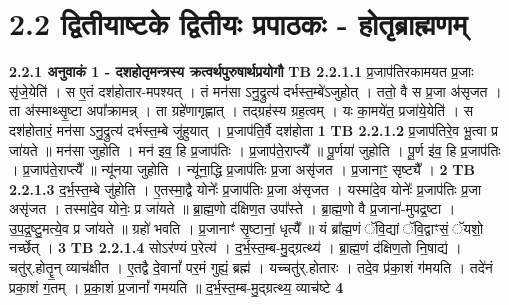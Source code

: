 \documentclass[17pt]{extarticle}
\begin{document}
     \section*{ 2.2     द्वितीयाष्टके द्वितीयः प्रपाठकः - होतृब्राह्मणम् }
                \textbf{ 2.2.1     अनुवाकं   1 - दशहोतृमन्त्रस्य क्रत्वर्थपुरुषार्थप्रयोगौ} \newline
                                \textbf{ TB 2.2.1.1} \newline
                  प्र॒जाप॑तिरकामयत प्र॒जाः सृ॑जे॒येति॑ । स ए॒तं दश॑होतार-मपश्यत् । तं मन॑सा ऽनु॒द्रुत्य॑ दर्भस्त॒म्बे॑ऽजुहोत् । ततो॒ वै स प्र॒जा अ॑सृजत । ता अ॑स्माथ्सृ॒ष्टा अपा᳚क्रामन्न् । ता ग्रहे॑णागृह्णात् । तद्ग्रह॑स्य ग्रह॒त्वम् । यः का॒मये॑त॒ प्रजा॑ये॒येति॑ । स दश॑होतारं॒ मन॑सा ऽनु॒द्रुत्य॑ दर्भस्त॒म्बे जु॑हुयात् । प्र॒जाप॑ति॒र्वै दश॑होता \textbf{ 1} \newline
                  \newline
                                \textbf{ TB 2.2.1.2} \newline
                  प्र॒जाप॑तिरे॒व भू॒त्वा प्र जा॑यते ॥ मन॑सा जुहोति । मन॑ इव॒ हि प्र॒जाप॑तिः । प्र॒जाप॑ते॒राप्त्यै᳚ ॥ पू॒र्णया॑ जुहोति । पू॒र्ण इ॑व॒ हि प्र॒जाप॑तिः । प्र॒जाप॑ते॒राप्त्यै᳚ ॥ न्यू॑नया जुहोति । न्यू॑ना॒द्धि प्र॒जाप॑तिः प्र॒जा असृ॑जत । प्र॒जानाꣳ॒॒ सृष्ट्यै᳚ । \textbf{ 2} \newline
                  \newline
                                \textbf{ TB 2.2.1.3} \newline
                  द॒र्भ॒स्त॒म्बे जु॑होति । ए॒तस्मा॒द्वै योनेः᳚ प्र॒जाप॑तिः प्र॒जा अ॑सृजत । यस्मा॑दे॒व योनेः᳚ प्र॒जाप॑तिः प्र॒जा असृ॑जत । तस्मा॑दे॒व योनेः॒ प्र जा॑यते ॥ ब्रा॒ह्म॒णो द॑क्षिण॒त उपा᳚स्ते । ब्रा॒ह्म॒णो वै प्र॒जाना॑-मुपद्र॒ष्टा । उ॒प॒द्र॒ष्टु॒मत्ये॒व प्र जा॑यते ॥ ग्रहो॑ भवति । प्र॒जानाꣳ॑ सृ॒ष्टानां॒ धृत्यै᳚ ॥ यं ब्रा᳚ह्म॒णं ॅवि॒द्यां ॅवि॒द्वाꣳसं॒ ॅयशो॒ नर्च्छेत् । \textbf{ 3} \newline
                  \newline
                                \textbf{ TB 2.2.1.4} \newline
                  सोऽर॑ण्यं प॒रेत्य॑ । द॒र्भ॒स्त॒म्ब-मु॒द्ग्रत्थ्य॑ । ब्रा॒ह्म॒णं द॑क्षिण॒तो नि॒षाद्य॑ । चतु॑र्.होतॄ॒न् व्याच॑क्षीत । ए॒तद्वै दे॒वानां᳚ पर॒मं गुह्यं॒ ब्रह्म॑ । यच्चतु॑र्.होतारः । तदे॒व प्र॑का॒शं ग॑मयति । तदे॑नं प्रका॒शं ग॒तम् । प्र॒का॒शं प्र॒जानां᳚ गमयति ॥ द॒र्भ॒स्त॒म्ब-मु॒द्ग्रत्थ्य॒ व्याच॑ष्टे \textbf{ 4} \newline
                  \newline
\end{document}

